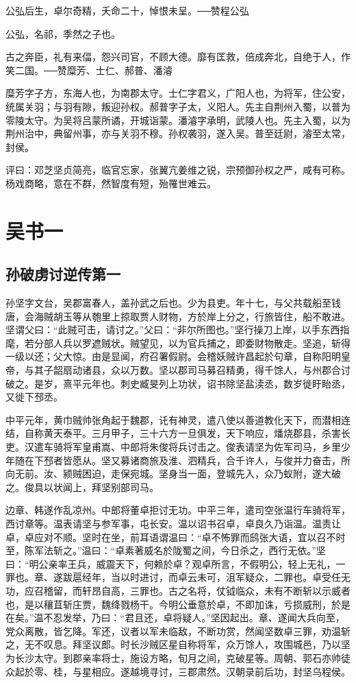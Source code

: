 \documentclass[12pt,UTF8]{ctexbook}
\begin{document}
公弘后生，卓尔奇精，夭命二十，悼恨未呈。──赞程公弘

公弘，名祁，季然之子也。

古之奔臣，礼有来偪，怨兴司官，不顾大德。靡有匡救，倍成奔北，自绝于人，作笑二国。──赞糜芳、士仁、郝普、潘濬

糜芳字子方，东海人也，为南郡太守。士仁字君义，广阳人也，为将军，住公安，统属关羽；与羽有隙，叛迎孙权。郝普字子太，义阳人。先主自荆州入蜀，以普为零陵太守。为吴将吕蒙所谲，开城诣蒙。潘濬字承明，武陵人也。先主入蜀，以为荆州治中，典留州事，亦与关羽不穆。孙权袭羽，遂入吴。普至廷尉，濬至太常，封侯。

评曰：邓芝坚贞简亮，临官忘家，张翼亢姜维之锐，宗预御孙权之严，咸有可称。杨戏商略，意在不群，然智度有短，殆罹世难云。

\part{吴书一}
\chapter{孙破虏讨逆传第一}

孙坚字文台，吴郡富春人，盖孙武之后也。少为县吏。年十七，与父共载船至钱唐，会海贼胡玉等从匏里上掠取贾人财物，方於岸上分之，行旅皆住，船不敢进。坚谓父曰：“此贼可击，请讨之。”父曰：“非尔所图也。”坚行操刀上岸，以手东西指麾，若分部人兵以罗遮贼状。贼望见，以为官兵捕之，即委财物散走。坚追，斩得一级以还；父大惊。由是显闻，府召署假尉。会稽妖贼许昌起於句章，自称阳明皇帝，与其子韶扇动诸县，众以万数。坚以郡司马募召精勇，得千馀人，与州郡合讨破之。是岁，熹平元年也。刺史臧旻列上功状，诏书除坚盐渎丞，数岁徙盱眙丞，又徙下邳丞。

中平元年，黄巾贼帅张角起于魏郡，讬有神灵，遣八使以善道教化天下，而潜相连结，自称黄天泰平。三月甲子，三十六方一旦俱发，天下响应，燔烧郡县，杀害长吏。汉遣车骑将军皇甫嵩、中郎将朱俊将兵讨击之。俊表请坚为佐军司马，乡里少年随在下邳者皆愿从。坚又募诸商旅及淮、泗精兵，合千许人，与俊并力奋击，所向无前。汝、颍贼困迫，走保宛城。坚身当一面，登城先入，众乃蚁附，遂大破之。俊具以状闻上，拜坚别部司马。

边章、韩遂作乱凉州。中郎将董卓拒讨无功。中平三年，遣司空张温行车骑将军，西讨章等。温表请坚与参军事，屯长安。温以诏书召卓，卓良久乃诣温。温责让卓，卓应对不顺。坚时在坐，前耳语谓温曰：“卓不怖罪而鸱张大语，宜以召不时至，陈军法斩之。”温曰：“卓素著威名於陇蜀之间，今日杀之，西行无依。”坚曰：“明公亲率王兵，威震天下，何赖於卓？观卓所言，不假明公，轻上无礼，一罪也。章、遂跋扈经年，当以时进讨，而卓云未可，沮军疑众，二罪也。卓受任无功，应召稽留，而轩昂自高，三罪也。古之名将，仗钺临众，未有不断斩以示威者也，是以穰苴斩庄贾，魏绛戮杨干。今明公垂意於卓，不即加诛，亏损威刑，於是在矣。”温不忍发举，乃曰：“君且还，卓将疑人。”坚因起出。章、遂闻大兵向至，党众离散，皆乞降。军还，议者以军未临敌，不断功赏，然闻坚数卓三罪，劝温斩之，无不叹息。拜坚议郎。时长沙贼区星自称将军，众万馀人，攻围城邑，乃以坚为长沙太守。到郡亲率将士，施设方略，旬月之间，克破星等。周朝、郭石亦帅徒众起於零、桂，与星相应。遂越境寻讨，三郡肃然。汉朝录前后功，封坚乌程侯。
\end{document}
